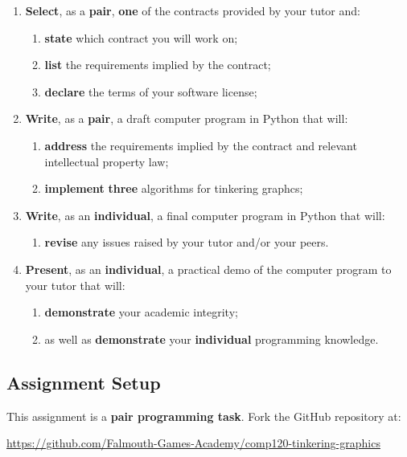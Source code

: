 \documentclass{../../fal_assignment}
\begin{document}
\begin{enumerate}[label=(\Alph*)]
    \item \textbf{Select}, as a \textbf{pair}, \textbf{one} of the contracts provided by your tutor and:
    	\begin{enumerate}[label=\roman*.]
    		\item \textbf{state} which contract you will work on;
    		\item \textbf{list} the requirements implied by the contract;
    		\item \textbf{declare} the terms of your software license;
	\end{enumerate}
    \item \textbf{Write}, as a \textbf{pair}, a draft computer program in Python that will:
    	\begin{enumerate}[label=\roman*.]
    		\item \textbf{address} the requirements implied by the contract and relevant intellectual property law;
    		\item \textbf{implement} \textbf{three} algorithms for tinkering graphcs;
	\end{enumerate}
    \item \textbf{Write}, as an \textbf{individual}, a final computer program in Python that will:
    	\begin{enumerate}[label=\roman*.]
    		\item \textbf{revise} any issues raised by your tutor and/or your peers.
	\end{enumerate}
    \item \textbf{Present}, as an \textbf{individual}, a practical demo of the computer program to your tutor that will:
    	\begin{enumerate}[label=\roman*.]
    		\item \textbf{demonstrate} your academic integrity;
    		\item as well as \textbf{demonstrate} your \textbf{individual} programming knowledge.
	\end{enumerate}
\end{enumerate}

\subsection*{Assignment Setup}

This assignment is a \textbf{pair programming task}. Fork the GitHub repository at:

\indent \url{https://github.com/Falmouth-Games-Academy/comp120-tinkering-graphics}
\end{document}
